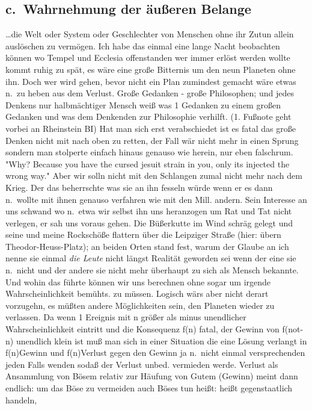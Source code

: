 \documentclass[
]{article}
\author{}
\date{\vspace{-2.5em}}
\begin{document}
\subsection{c.~Wahrnehmung der äußeren
Belange}\label{c.-wahrnehmung-der-uxe4uuxdferen-belange}

\ldots die Welt oder System oder Geschlechter von Menschen ohne ihr
Zutun allein auslöschen zu vermögen. Ich habe das einmal eine lange
Nacht beobachten können wo Tempel und Ecclesia offenstanden wer immer
erlöst werden wollte kommt ruhig zu spät, es wäre eine große Bitternis
um den neun Planeten ohne ihn. Doch wer wird gehen, bevor nicht ein Plan
zumindest gemacht wäre etwas n.~zu heben aus dem Verlust. Große Gedanken
- große Philosophen; und jedes Denkens nur halbmächtiger Mensch weiß was
1 Gedanken zu einem großen Gedanken und was dem Denkenden zur
Philosophie verhilft. (1. Fußnote geht vorbei an Rheinstein BI) Hat man
sich erst verabschiedet ist es fatal das große Denken nicht mit nach
oben zu retten, der Fall wär nicht mehr in einen Sprung sondern man
stolperte einfach hinaus genauso wie herein, nur eben falschrum. "Why?
Because you have the cursed jesuit strain in you, only
it\textquotesingle s injected the wrong way." Aber wir solln nicht mit
den Schlangen zumal nicht mehr nach dem Krieg. Der das beherrschte was
sie an ihn fesseln würde wenn er es dann n.~wollte mit ihnen genauso
verfahren wie mit den Mill. andern. Sein Interesse an uns schwand wo
n.~etwa wir selbst ihn uns heranzogen um Rat und Tat nicht verlegen, er
sah uns voraus gehen. Die Büßerkutte im Wind schräg gelegt und seine und
meine Rockschöße flattern über die Leipziger Straße (hier: übern
Theodor-Heuss-Platz); an beiden Orten stand fest, warum der Glaube an
ich nenne sie einmal \emph{die Leute} nicht längst Realität geworden sei
wenn der eine sie n.~nicht und der andere sie nicht mehr überhaupt zu
sich als Mensch bekannte. Und wohin das führte können wir uns berechnen
ohne sogar um irgende Wahrscheinlichkeit bemühts. zu müssen. Logisch
wärs aber nicht derart vorzugehn, es müßten andere Möglichkeiten sein,
den Planeten wieder zu verlassen. Da wenn 1 Ereignis mit n größer als
minus unendlicher Wahrscheinlichkeit eintritt und die Konsequenz f(n)
fatal, der Gewinn von f(not-n) unendlich klein ist muß man sich in einer
Situation die eine Lösung verlangt in f(n)Gewinn und f(n)Verlust gegen
den Gewinn ja n.~nicht einmal versprechenden jeden Falls wenden sodaß
der Verlust unbed. vermieden werde. Verlust als Ansammlung von Bösem
relativ zur Häufung von Gutem (Gewinn) meint dann endlich: um das Böse
zu vermeiden auch Böses tun heißt: heißt gegenstaatlich handeln,
\end{document}
